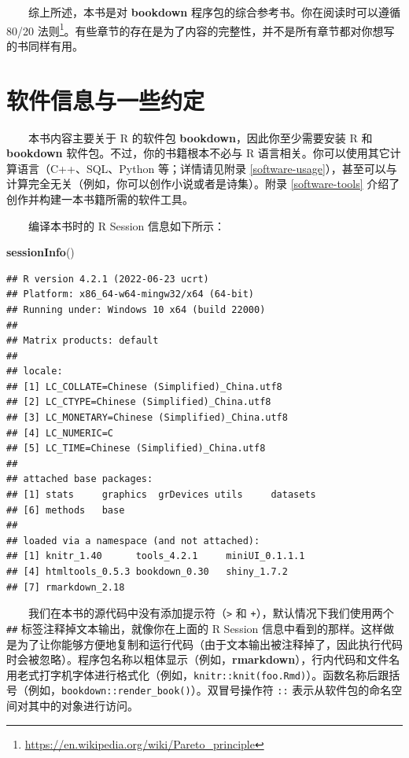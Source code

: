 \documentclass[
  12pt,
]{krantz}
\newenvironment{Shaded}{\begin{snugshade}}{\end{snugshade}}
\newcommand{\FunctionTok}[1]{\textcolor[rgb]{0.13,0.29,0.53}{\textbf{#1}}}
\newcommand{\NormalTok}[1]{#1}
\renewcommand{\href}[2]{#2\footnote{\url{#1}}}
\theoremstyle{definition}
\theoremstyle{definition}
\theoremstyle{definition}
\theoremstyle{definition}
\theoremstyle{remark}
\begin{document}
  综上所述，本书是对 \textbf{bookdown} 程序包的综合参考书。你在阅读时可以遵循 \href{https://en.wikipedia.org/wiki/Pareto_principle}{80/20 法则}。有些章节的存在是为了内容的完整性，并不是所有章节都对你想写的书同样有用。

\hypertarget{ux8f6fux4ef6ux4fe1ux606fux4e0eux4e00ux4e9bux7ea6ux5b9a}{%
\section*{软件信息与一些约定}\label{ux8f6fux4ef6ux4fe1ux606fux4e0eux4e00ux4e9bux7ea6ux5b9a}}


  本书内容主要关于 R 的软件包 \textbf{bookdown}，因此你至少需要安装 R 和 \textbf{bookdown} 软件包。不过，你的书籍根本不必与 R 语言相关。你可以使用其它计算语言（C++、SQL、Python 等；详情请见附录 \ref{software-usage}），甚至可以与计算完全无关（例如，你可以创作小说或者是诗集）。附录 \ref{software-tools} 介绍了创作并构建一本书籍所需的软件工具。

  编译本书时的 R Session 信息如下所示：

\begin{Shaded}
\begin{Highlighting}[]
\FunctionTok{sessionInfo}\NormalTok{()}
\end{Highlighting}
\end{Shaded}

\begin{verbatim}
## R version 4.2.1 (2022-06-23 ucrt)
## Platform: x86_64-w64-mingw32/x64 (64-bit)
## Running under: Windows 10 x64 (build 22000)
## 
## Matrix products: default
## 
## locale:
## [1] LC_COLLATE=Chinese (Simplified)_China.utf8 
## [2] LC_CTYPE=Chinese (Simplified)_China.utf8   
## [3] LC_MONETARY=Chinese (Simplified)_China.utf8
## [4] LC_NUMERIC=C                               
## [5] LC_TIME=Chinese (Simplified)_China.utf8    
## 
## attached base packages:
## [1] stats     graphics  grDevices utils     datasets 
## [6] methods   base     
## 
## loaded via a namespace (and not attached):
## [1] knitr_1.40      tools_4.2.1     miniUI_0.1.1.1 
## [4] htmltools_0.5.3 bookdown_0.30   shiny_1.7.2    
## [7] rmarkdown_2.18
\end{verbatim}

  我们在本书的源代码中没有添加提示符（\texttt{\textgreater{}} 和 \texttt{+}），默认情况下我们使用两个 \texttt{\#\#} 标签注释掉文本输出，就像你在上面的 R Session 信息中看到的那样。这样做是为了让你能够方便地复制和运行代码（由于文本输出被注释掉了，因此执行代码时会被忽略）。程序包名称以粗体显示（例如，\textbf{rmarkdown}），行内代码和文件名用老式打字机字体进行格式化（例如，\texttt{knitr::knit(\textquotesingle{}foo.Rmd\textquotesingle{})}）。函数名称后跟括号（例如，\texttt{bookdown::render\_book()}）。双冒号操作符 \texttt{::} 表示从软件包的命名空间对其中的对象进行访问。
\end{document}
